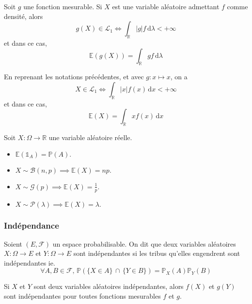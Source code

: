   \begin{corollary}
    Soit $g$ une fonction mesurable. Si $X$ est une variable aléatoire admettant $f$ comme densité, alors
    \[ g(X) \in \mathcal{L}_1 \iff \int_{\mathbb{R}} \vert g \vert f \, \mathrm{d}\lambda < +\infty \]
    et dans ce cas,
    \[ \mathbb{E}(g(X)) = \int_{\mathbb{R}} g f \, \mathrm{d}\lambda \]
  \end{corollary}

  \begin{remark}
    En reprenant les notations précédentes, et avec $g : x \mapsto x$, on a
    \[ X \in \mathcal{L}_1 \iff \int_{\mathbb{R}} \vert x \vert f(x) \, \mathrm{d}x < +\infty \]
    et dans ce cas,
    \[ \mathbb{E}(X) = \int_{\mathbb{R}} x f(x) \, \mathrm{d}x \]
  \end{remark}


  \begin{example}
    Soit $X : \Omega \rightarrow \mathbb{R}$ une variable aléatoire réelle.
    \begin{itemize}
      \item $\mathbb{E}(\mathbb{1}_A) = \mathbb{P}(A)$.
      \item $X \sim \mathcal{B}(n, p) \implies \mathbb{E}(X) = np$.
      \item $X \sim \mathcal{G}(p) \implies \mathbb{E}(X) = \frac{1}{p}$.
      \item $X \sim \mathcal{P}(\lambda) \implies \mathbb{E}(X) = \lambda$.
    \end{itemize}
  \end{example}

  \subsubsection{Indépendance}


  \begin{definition}
    Soient $(E, \mathcal{F})$ un espace probabilisable. On dit que deux variables aléatoires $X : \Omega \rightarrow E$ et $Y : \Omega \rightarrow E$ sont indépendantes si les tribus qu'elles engendrent sont indépendantes ie.
    \[ \forall A, B \in \mathcal{F}, \, \mathbb{P}(\{ X \in A \} \, \cap \, \{ Y \in B \}) = \mathbb{P}_X(A) \mathbb{P}_Y(B) \]
  \end{definition}

  \begin{proposition}
    Si $X$ et $Y$ sont deux variables aléatoires indépendantes, alors $f(X)$ et $g(Y)$ sont indépendantes pour toutes fonctions mesurables $f$ et $g$.
  \end{proposition}

